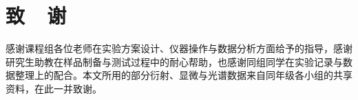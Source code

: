 ﻿\section*{致\ \ 谢}

感谢课程组各位老师在实验方案设计、仪器操作与数据分析方面给予的指导，感谢研究生助教在样品制备与测试过程中的耐心帮助，也感谢同组同学在实验记录与数据整理上的配合。本文所用的部分衍射、显微与光谱数据来自同年级各小组的共享资料，在此一并致谢。

